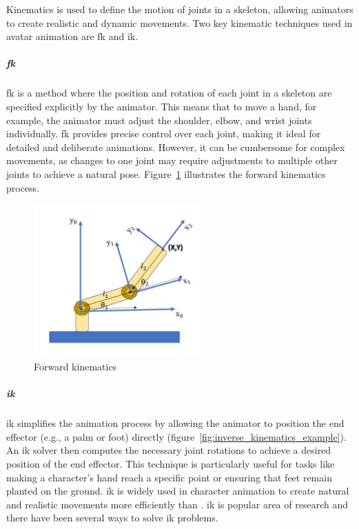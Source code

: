 \documentclass[../../main.tex]{subfiles}
\begin{document}
Kinematics is used to define the motion of joints in a skeleton, allowing animators to create realistic and dynamic movements. Two key kinematic techniques used in avatar animation are \gls{fk} and \gls{ik}.

\subparagraph{\gls{fk}}
\label{ch:background_work:sign_language_synthesis:3d_techniques:avatar_animation:kinematics:forward_kinematics}

\gls{fk} is a method where the position and rotation of each joint in a skeleton are specified explicitly by the animator. This means that to move a hand, for example, the animator must adjust the shoulder, elbow, and wrist joints individually. \gls{fk} provides precise control over each joint, making it ideal for detailed and deliberate animations. However, it can be cumbersome for complex movements, as changes to one joint may require adjustments to multiple other joints to achieve a natural pose. Figure~\ref{fig:forward_kinematics_example} illustrates the forward kinematics process.

\begin{figure} 
  \centering \includegraphics[width = 2.5in]{chapters/background_work/images/forward_kinematics_example.png} 
  \caption{Forward kinematics} 
  \label{fig:forward_kinematics_example} 
\end{figure}

\subparagraph{\gls{ik}}
\label{ch:background_work:sign_language_synthesis:3d_techniques:avatar_animation:kinematics:inverse_kinematics}

\gls{ik} simplifies the animation process by allowing the animator to position the end effector (e.g., a palm or foot) directly (figure~\ref{fig:inverse_kinematics_example}). An \gls{ik} solver then computes the necessary joint rotations to achieve a desired position of the end effector. This technique is particularly useful for tasks like making a character’s hand reach a specific point or ensuring that feet remain planted on the ground. \gls{ik} is widely used in character animation to create natural and realistic movements more efficiently than . \gls{ik} is popular area of research and there have been several ways to solve \gls{ik} problems.
\end{document}
